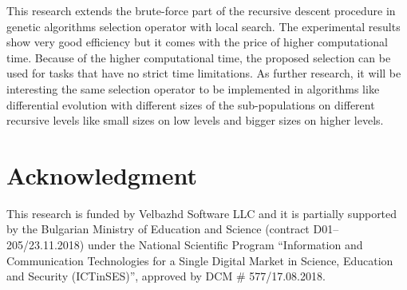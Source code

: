 \documentclass[conference]{IEEEtran}
\begin{document}
This research extends the brute-force part of the recursive descent procedure in genetic algorithms selection operator with local search. The experimental results show very good efficiency but it comes with the price of higher computational time. Because of the higher computational time, the proposed selection can be used for tasks that have no strict time limitations. As further research, it will be interesting the same selection operator to be implemented in algorithms like differential evolution with different sizes of the sub-populations on different recursive levels like small sizes on low levels and bigger sizes on higher levels. 

\section*{Acknowledgment}

This research is funded by Velbazhd Software LLC and it is partially supported by the Bulgarian Ministry of Education and Science (contract D01–205/23.11.2018) under the National Scientific Program ``Information and Communication Technologies for a Single Digital Market in Science, Education and Security (ICTinSES)'', approved by DCM \# 577/17.08.2018.

\begin{thebibliography}{99}

\bibitem{}

\end{thebibliography}
\end{document}
